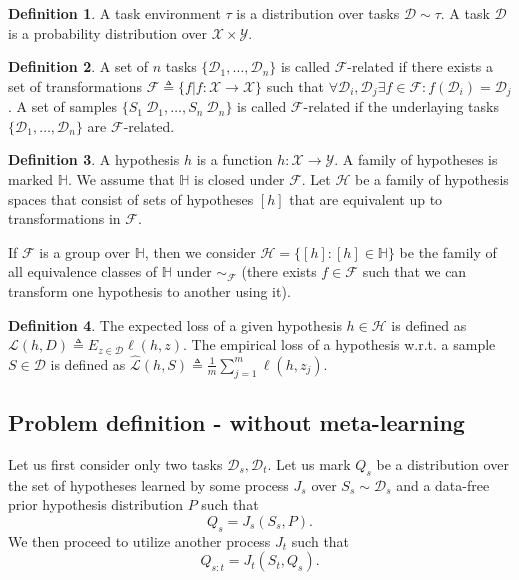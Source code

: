 \documentclass[letterpaper]{article}
\theoremstyle{definition}
\newtheorem{defn}{Definition}[section]
\begin{document}
\begin{defn}
	A task environment $\tau$ is a distribution over tasks $\mathcal{D}\sim \tau$. A task $\mathcal{D}$ is a probability distribution over $\mathcal{X}\times \mathcal{Y}$.
\end{defn}

\begin{defn}
	A set of $n$ tasks $\{\mathcal{D}_1,\ldots,\mathcal{D}_n\}$ is called $\mathcal{F}$-related if there exists a set of transformations $\mathcal{F}\triangleq\{f|f:\mathcal{X}\rightarrow\mathcal{X}\}$ such that $\forall\mathcal{D}_i,\mathcal{D}_j \exists f\in\mathcal{F}: f(\mathcal{D}_i)=\mathcal{D}_j$.
	A set of samples $\{S_1~\mathcal{D}_1,\ldots,S_n~\mathcal{D}_n\}$ is called $\mathcal{F}$-related if the underlaying tasks $\{\mathcal{D}_1,\ldots,\mathcal{D}_n\}$ are $\mathcal{F}$-related.
\end{defn}

\begin{defn}
	A hypothesis $h$ is a function $h:\mathcal{X}\rightarrow\mathcal{Y}$. A family of hypotheses is marked $\mathbb{H}$. We assume that $\mathbb{H}$ is closed under $\mathcal{F}$. Let $\mathcal{H}$ be a family of hypothesis spaces that consist of sets of hypotheses $[h]$ that are equivalent up to transformations in $\mathcal{F}$. 
	
	If $\mathcal{F}$ is a group over $\mathbb{H}$, then we consider $\mathcal{H}=\{[h]:[h]\in\mathbb{H}\}$ be the family of all equivalence classes of $\mathbb{H}$ under $\sim_\mathcal{F}$ (there exists $f\in\mathcal{F}$ such that we can transform one hypothesis to another using it).
\end{defn}

\begin{defn}
	The expected loss of a given hypothesis $h\in \mathcal{H}$ is defined as $\mathcal{L}(h, D) \triangleq E_{z\in \mathcal{D}} \ell(h, z)$. The empirical loss of a hypothesis w.\!r.\!t.\! a sample $S\in \mathcal{D}$ is defined as $\hat{\mathcal{L}}(h, S) \triangleq \frac{1}{m}\sum_{j=1}^{m}\ell(h, z_j)$.
\end{defn}

\subsection{Problem definition - without meta-learning} \label{sec:forgetting-formulation}

Let us first consider only two tasks $\mathcal{D}_s, \mathcal{D}_t$. Let us mark $Q_s$ be a distribution over the set of hypotheses learned by some process $J_s$ over $S_s\sim \mathcal{D}_s$ and a data-free prior hypothesis distribution $P$ such that $$Q_s=J_s(S_s, P).$$ We then proceed to utilize another process $J_t$ such that $$Q_{s:t}=J_t(S_t, Q_s).$$ 
\end{document}
